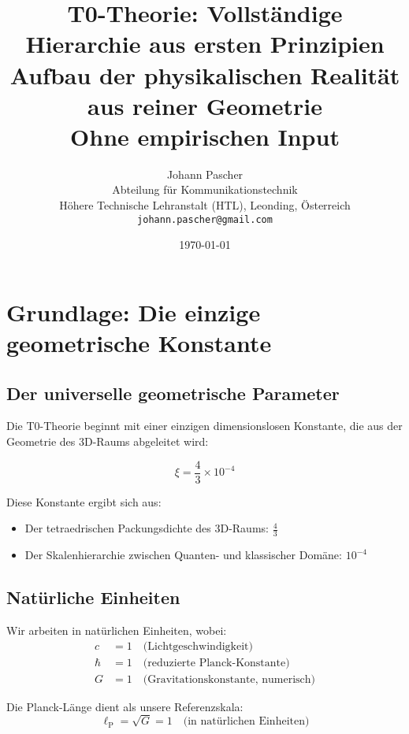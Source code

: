 \documentclass[12pt,a4paper]{article}
\title{\textbf{T0-Theorie: Vollst\"andige Hierarchie aus ersten Prinzipien}\\[0.5cm]
	\large Aufbau der physikalischen Realit\"at aus reiner Geometrie\\[0.3cm]
	\normalsize Ohne empirischen Input}
\author{Johann Pascher\\
	Abteilung f\"ur Kommunikationstechnik\\
	H\"ohere Technische Lehranstalt (HTL), Leonding, \"Osterreich\\
	\texttt{johann.pascher@gmail.com}}
\date{\today}
\newcommand{\lP}{\ell_{\text{P}}}
\newcommand{\xipar}{\xi}
\begin{document}
	\maketitle
	\tableofcontents
	\newpage
	
	\section{Grundlage: Die einzige geometrische Konstante}
	
	\subsection{Der universelle geometrische Parameter}
	
	Die T0-Theorie beginnt mit einer einzigen dimensionslosen Konstante, die aus der Geometrie des 3D-Raums abgeleitet wird:
	
	\begin{keyresult}
		\begin{equation}
			\boxed{\xipar = \frac{4}{3} \times 10^{-4}}
		\end{equation}
	\end{keyresult}
	
	Diese Konstante ergibt sich aus:
	\begin{itemize}
		\item Der tetraedrischen Packungsdichte des 3D-Raums: $\frac{4}{3}$
		\item Der Skalenhierarchie zwischen Quanten- und klassischer Dom\"ane: $10^{-4}$
	\end{itemize}
	
	\subsection{Nat\"urliche Einheiten}
	Wir arbeiten in nat\"urlichen Einheiten, wobei:
	\begin{align}
		c &= 1 \quad \text{(Lichtgeschwindigkeit)} \\
		\hbar &= 1 \quad \text{(reduzierte Planck-Konstante)} \\
		G &= 1 \quad \text{(Gravitationskonstante, numerisch)}
	\end{align}
	
	Die Planck-L\"ange dient als unsere Referenzskala:
	\begin{equation}
		\lP = \sqrt{G} = 1 \quad \text{(in nat\"urlichen Einheiten)}
	\end{equation}
	
\end{document}
